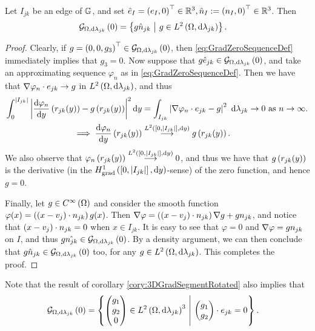 \begin{cory} \label{cory:3DGradSegmentRotated}
	Let $I_{jk}$ be an edge of $\mathbb{G}$, and set $\hat{e}_{I} = \left( e_{I}, 0 \right)^\top\in\mathbb{R}^3, \hat{n}_{I} := \left( n_{I}, 0 \right)^\top\in\mathbb{R}^3$.
	Then
	\begin{align*}
		\mathcal{G}_{ \Omega, \mathrm{d}\lambda_{jk}}\left( 0 \right) &= 
		\left\{  g \hat{n}_{jk} \ \middle\vert \  g\in L^{2}\left( \Omega,\mathrm{d}\lambda_{jk} \right)  \right\}.
	\end{align*}
\end{cory}
\begin{proof}
	Clearly, if $g = \left( 0,0,g_3 \right)^\top\in\mathcal{G}_{ \Omega, \mathrm{d}\lambda_{jk}}\left( 0 \right)$, then \eqref{eq:GradZeroSequenceDef} immediately implies that $g_3=0$.
	Now suppose that $g\hat{e}_{jk}\in\mathcal{G}_{ \Omega, \mathrm{d}\lambda_{jk}}\left( 0 \right)$, and take an approximating sequence $\varphi_n$ as in \eqref{eq:GradZeroSequenceDef}.
	Then we have that $\nabla\varphi_n\cdot e_{jk} \rightarrow g$ in $L^{2}\left( \Omega,\mathrm{d}\lambda_{jk} \right)$, and thus
	\begin{align*}
		\int_0^{\left\lvert I_{jk} \right\rvert} \left\lvert  \dfrac{\mathrm{d}\varphi_n}{\mathrm{d}y}\left( r_{jk}(y) \right) - g\left( r_{jk}(y) \right)  \right\rvert^2 \mathrm{d} y
		&= \int_{I_{jk}} \left\lvert  \nabla\varphi_n\cdot e_{jk} - g  \right\rvert^2  \ \mathrm{d}\lambda_{jk}
		\rightarrow 0 \ \text{as} \ n \rightarrow\infty. \\
		\implies \dfrac{\mathrm{d}\varphi_n}{\mathrm{d}y}\left( r_{jk}(y) \right) &\overset{L^{2}\left( \left[ 0,\left\lvert I_{jk} \right\rvert \right],\mathrm{d}y \right)}{\longrightarrow} g\left( r_{jk}(y) \right).
	\end{align*}
	We also observe that $\varphi_n\left( r_{jk}(y) \right)\overset{L^{2}\left( \left[ 0,\left\lvert I_{jk} \right\rvert \right],\mathrm{d}y \right)}{\longrightarrow} 0$, and thus we have that $g\left( r_{jk}(y) \right)$ is the derivative (in the $H^1_\mathrm{grad}\left( \left[ 0,\left\lvert I_{jk} \right\rvert \right], \mathrm{d}y \right)$-sense) of the zero function, and hence $g=0$.
	
	Finally, let $g\in C^{\infty}\left( \Omega \right)$ and consider the smooth function $\varphi(x) = \left( \left( x - v_j \right)\cdot n_{jk} \right)g(x)$.
	Then $\nabla\varphi = \left( \left( x - v_j \right)\cdot n_{jk} \right)\nabla g + g n_{jk}$, and notice that $\left( x - v_j \right)\cdot n_{jk} = 0$ when $x\in I_{jk}$.
	It is easy to see that $\varphi=0$ and $\nabla\varphi = g n_{jk}$ on $I$, and thus $g \hat{n_{jk}}\in\mathcal{G}_{ \Omega, \mathrm{d}\lambda_{jk}}\left( 0 \right)$.
	By a density argument, we can then conclude that $g\hat{n}_{jk}\in\mathcal{G}_{ \Omega, \mathrm{d}\lambda_{jk}}\left( 0 \right)$ too, for any $g\in L^{2}\left( \Omega,\mathrm{d}\lambda_{jk} \right)$.
	This completes the proof.
\end{proof}
Note that the result of corollary \ref{cory:3DGradSegmentRotated} also implies that
\begin{align*}
	\mathcal{G}_{ \Omega, \mathrm{d}\lambda_{jk}}\left( 0 \right) &= 
		\left\{  \begin{pmatrix} g_1 \\ g_2 \\ 0 \end{pmatrix}\in L^{2}\left( \Omega,\mathrm{d}\lambda_{jk} \right)^3 \ \middle\vert \  \begin{pmatrix} g_1 \\ g_2 \end{pmatrix} \cdot e_{jk} = 0  \right\}.
\end{align*}
